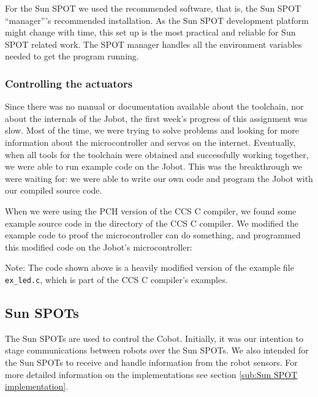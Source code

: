 \documentclass[a4paper,10pt]{article} %
\begin{document}
For the Sun SPOT we used the recommended software, that is, the Sun SPOT
``manager'''s recommended installation. As the Sun SPOT development platform
might change with time, this set up is the most practical and reliable for Sun
SPOT related work. The SPOT manager handles all the environment variables needed
to get the program running.


\subsubsection{Controlling the actuators} %
\label{sub:Cobot implementation}

Since there was no manual or documentation available about the toolchain, nor
about the internals of the Jobot, the first week's progress of this assignment
was slow. Most of the time, we were trying to solve problems and looking for
more information about the microcontroller and servos on the internet.
Eventually, when all tools for the toolchain were obtained and successfully
working together, we were able to run example code on the Jobot. This was the
breakthrough we were waiting for: we were able to write our own code and program
the Jobot with our compiled source code.

When we were using the PCH version of the CCS C compiler, we found some example
source code in the directory of the CCS C compiler. We modified the example code
to proof the microcontroller can do something, and programmed this modified code
on the Jobot's microcontroller:



\noindent Note: The code shown above is a heavily modified version of the
example file \texttt{ex\_led.c}, which is part of the CCS C compiler's examples.



\subsection{Sun SPOTs} %
\label{sec:sunspot}

The Sun SPOTs are used to control the Cobot. Initially, it was our intention to
stage communications between robots over the Sun SPOTs. We also intended for the
Sun SPOTs to receive and handle information from the robot sensors. For more
detailed information on the implementations see section \ref{sub:Sun SPOT
implementation}.
\end{document}
